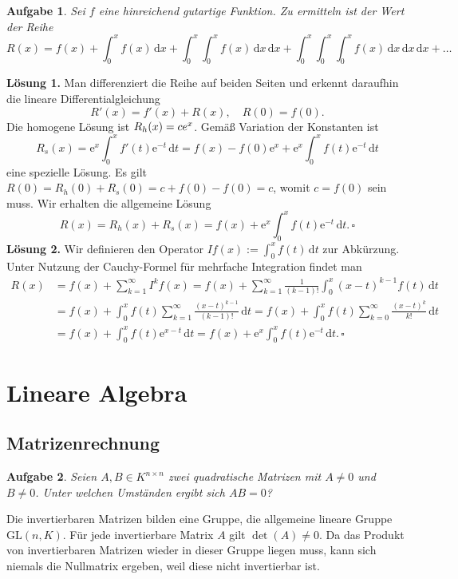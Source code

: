 \documentclass[a4paper,10pt,fleqn,twoside]{scrartcl}
\numberwithin{equation}{section}
\newcommand{\ee}{\mathrm e}
\newcommand{\strong}[1]{{\normalfont\sffamily\bfseries #1}}
\renewcommand{\qedsymbol}{\ensuremath{\square}}
\theoremstyle{Aufgabe}
\newtheorem{Aufgabe}{\sffamily Aufgabe}[section]
\begin{document}
\begin{Aufgabe}
Sei $f$ eine hinreichend gutartige Funktion. Zu ermitteln ist
der Wert der Reihe
\[R(x) = f(x) + \int_0^x f(x)\,\mathrm dx+
\int_0^x\int_0^x f(x)\,\mathrm dx\,\mathrm dx+
\int_0^x\int_0^x\int_0^x f(x)\,\mathrm dx\,\mathrm dx\,\mathrm dx+\ldots\]
\end{Aufgabe}
\strong{Lösung 1.} Man differenziert die Reihe auf beiden Seiten
und erkennt daraufhin die lineare Differentialgleichung
\[R'(x) = f'(x) + R(x),\quad R(0)=f(0).\]
Die homogene Lösung ist $R_h(x)=c\mathrm \ee^x$. Gemäß Variation
der Konstanten ist
\[R_s(x) = \ee^x\int_0^x f'(t)\ee^{-t}\,\mathrm dt
= f(x)-f(0)\ee^x+\ee^x\int_0^x f(t)\ee^{-t}\,\mathrm dt\]
eine spezielle Lösung. Es gilt $R(0)=R_h(0)+R_s(0) = c+f(0)-f(0)=c$,
womit $c=f(0)$ sein muss. Wir erhalten die allgemeine Lösung
\[R(x) = R_h(x)+R_s(x) = f(x) + \ee^x\int_0^x f(t)\ee^{-t}\,\mathrm dt.\,\qedsymbol\]
\strong{Lösung 2.} Wir definieren den Operator
$If(x):=\int_0^x f(t)\,\mathrm dt$ zur Abkürzung. Unter Nutzung der
Cauchy-Formel für mehrfache Integration findet man
\begin{align*}
R(x) &= f(x) + \sum_{k=1}^\infty I^k f(x)
= f(x) + \sum_{k=1}^\infty \frac{1}{(k-1)!}\int_0^x (x-t)^{k-1}f(t)\,\mathrm dt\\
&= f(x) + \int_0^x f(t)\sum_{k=1}^\infty \frac{(x-t)^{k-1}}{(k-1)!}\,\mathrm dt
= f(x) + \int_0^x f(t)\sum_{k=0}^\infty \frac{(x-t)^k}{k!}\,\mathrm dt\\
&= f(x) + \int_0^x f(t)\ee^{x-t}\,\mathrm dt
= f(x) + \ee^x\int_0^x f(t)\ee^{-t}\,\mathrm dt.\,\qedsymbol
\end{align*}


\newpage
\section{Lineare Algebra}
\subsection{Matrizenrechnung}
\begin{Aufgabe}
Seien $A,B\in K^{n\times n}$ zwei quadratische Matrizen mit $A\ne 0$
und $B\ne 0$. Unter welchen Umständen ergibt sich $AB=0$?
\end{Aufgabe}

\noindent\strong{Lösung.}
Die invertierbaren Matrizen bilden eine Gruppe, die allgemeine
lineare Gruppe $\mathrm{GL}(n,K)$. Für jede invertierbare Matrix $A$
gilt $\det(A)\ne 0$. Da das Produkt von invertierbaren Matrizen
wieder in dieser Gruppe liegen muss, kann sich niemals die Nullmatrix
ergeben, weil diese nicht invertierbar ist.
\end{document}
